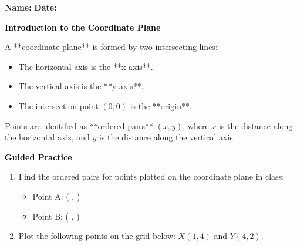 \documentclass[12pt, letterpaper, fleqn]{article}
\newcommand{\blank}{\underline{\hspace{2.2cm}}}
\begin{document}
\textbf{Name:} \underline{\hspace{5cm}}
\hfill
\textbf{Date:} \underline{\hspace{3cm}}\\

\begin{tcolorbox}[colback=customteal!20]
    \large\textcolor{black}{\textbf{Introduction to the Coordinate Plane}}
\end{tcolorbox}

\vspace{3mm}
\noindent
A **coordinate plane** is formed by two intersecting lines:
\begin{itemize}
    \item The horizontal axis is the **x-axis**.
    \item The vertical axis is the **y-axis**.
    \item The intersection point $(0,0)$ is the **origin**.
\end{itemize}
Points are identified as **ordered pairs** $(x, y)$, where $x$ is the distance along the horizontal axis, and $y$ is the distance along the vertical axis.

\begin{center}
\end{center}

\newpage
\begin{tcolorbox}[colback=customteal!20]
    \large\textcolor{black}{\textbf{Guided Practice}}
\end{tcolorbox}

\vspace{5mm}
\begin{enumerate}[itemsep=4.5cm, leftmargin=0.6cm]
\item Find the ordered pairs for points plotted on the coordinate plane in class:
  \begin{itemize}[itemsep=0.8cm]
    \item Point A: ( \blank, \blank )
    \item Point B: ( \blank, \blank )
  \end{itemize}

\item Plot the following points on the grid below: $X(1, 4)$ and $Y(4, 2)$.
\begin{center}
\end{center}
\end{enumerate}
\end{document}
